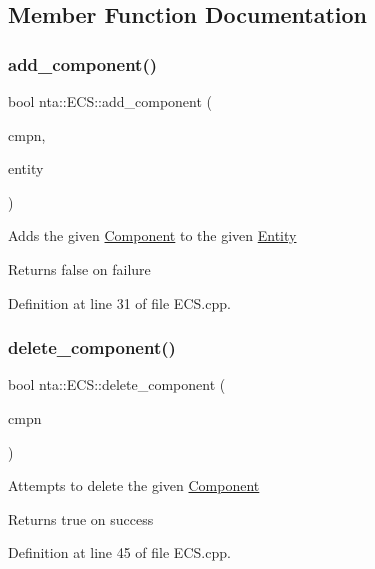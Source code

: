 \subsection{Member Function Documentation}
\mbox{\label{classnta_1_1ECS_a3388e8ae1ef45258356c742efcc00048}} 
\subsubsection{\texorpdfstring{add\+\_\+component()}{add\_component()}}
{\footnotesize\ttfamily bool nta\+::\+E\+C\+S\+::add\+\_\+component (\begin{DoxyParamCaption}\item[{\hyperlink{classnta_1_1Component}{Component} $\ast$}]{cmpn,  }\item[{Entity\+ID}]{entity }\end{DoxyParamCaption})}

Adds the given \hyperlink{classnta_1_1Component}{Component} to the given \hyperlink{classnta_1_1Entity}{Entity}

Returns false on failure 

Definition at line 31 of file E\+C\+S.\+cpp.

\mbox{\label{classnta_1_1ECS_ab24523ec53373bc159f67ee20d269975}} 
\subsubsection{\texorpdfstring{delete\+\_\+component()}{delete\_component()}}
{\footnotesize\ttfamily bool nta\+::\+E\+C\+S\+::delete\+\_\+component (\begin{DoxyParamCaption}\item[{\hyperlink{classnta_1_1Component}{Component} $\ast$}]{cmpn }\end{DoxyParamCaption})}

Attempts to delete the given \hyperlink{classnta_1_1Component}{Component}

Returns true on success 

Definition at line 45 of file E\+C\+S.\+cpp.


